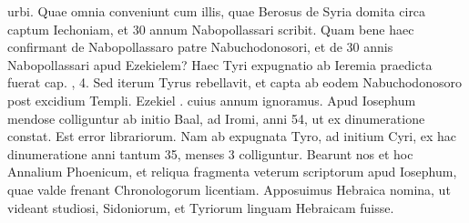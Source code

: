 urbi.
Quae omnia conveniunt cum illis, quae Berosus de Syria
domita circa captum Iechoniam, et 30 annum Nabopollassari scribit.
Quam bene haec confirmant de Nabopollassaro patre Nabuchodonosori,
et de 30 annis Nabopollassari apud Ezekielem?
Haec Tyri expugnatio ab Ieremia praedicta fuerat cap. , 4.
Sed iterum
Tyrus rebellavit, et capta ab eodem Nabuchodonosoro post
excidium Templi.
Ezekiel . cuius annum ignoramus.
Apud
Iosephum mendose colliguntur ab initio Baal, ad  Iromi, anni
54, ut ex dinumeratione constat.
Est error librariorum.
Nam ab expugnata
Tyro, ad initium Cyri, ex hac dinumeratione anni tantum
35, menses 3 colliguntur.
Bearunt nos et hoc Annalium Phoenicum,
et reliqua fragmenta veterum scriptorum apud Iosephum, quae valde
frenant Chronologorum licentiam.
Apposuimus Hebraica
nomina, ut videant studiosi, Sidoniorum, et Tyriorum linguam
Hebraicam fuisse.

